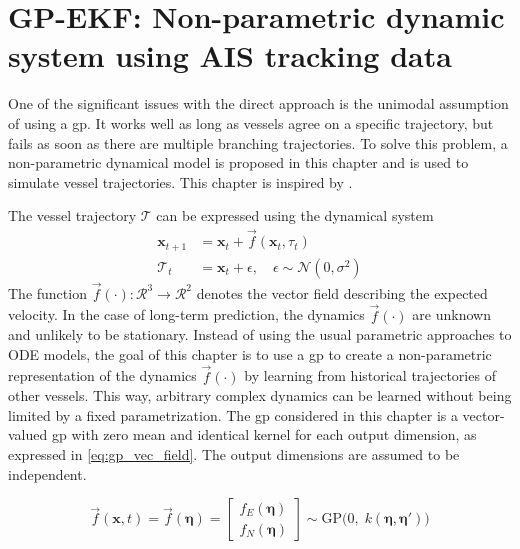 \chapter{GP-EKF: Non-parametric dynamic system using AIS tracking data}\label{chap:gp_ekf}
One of the significant issues with the direct approach is the unimodal assumption of using a \acrshort{gp}. It works well as long as vessels agree on a specific trajectory, but fails as soon as there are multiple branching trajectories. To solve this problem, a non-parametric dynamical model is proposed in this chapter and is used to simulate vessel trajectories. This chapter is inspired by \cite{pedestrian,gpekf,vehicle_gp_prediction,multistep_gp}.



The vessel trajectory $\boldsymbol{\mathcal{T}}$ can be expressed using the dynamical system
\begin{subequations}
    \begin{align}
        \boldsymbol{x}_{t+1}       & = \boldsymbol{x}_t + \vec{f}(\boldsymbol{x}_t,\tau_t)                       \\
        \boldsymbol{\mathcal{T}}_t & = \boldsymbol{x}_t + \epsilon, \quad \epsilon \sim \mathcal{N}(0, \sigma^2)
    \end{align}
\end{subequations}
The function $\vec{f}(\cdot): \mathcal{R}^3 \to \mathcal{R}^2$ denotes the vector field describing the expected velocity. In the case of long-term prediction, the dynamics $\vec{f}(\cdot)$ are unknown and unlikely to be stationary. Instead of using the usual parametric approaches to ODE models, the goal of this chapter is to use a \acrshort{gp} to create a non-parametric representation of the dynamics $\vec{f}(\cdot)$ by learning from historical trajectories of other vessels. This way, arbitrary complex dynamics can be learned without being limited by a fixed parametrization. The \acrshort{gp} considered in this chapter is a vector-valued \acrshort{gp} with zero mean and identical kernel for each output dimension, as expressed in \cref{eq:gp_vec_field}. The output dimensions are assumed to be independent.

\begin{equation}\label{eq:gp_vec_field}
    \vec{f}(\boldsymbol{x}, t) = \vec{f}(\boldsymbol{\eta}) = \begin{bmatrix} f_E (\boldsymbol{\eta})\\ f_N (\boldsymbol{\eta})\end{bmatrix} \sim \text{GP} \big(0 , \; k(\boldsymbol{\eta}, \boldsymbol{\eta}')\big)
\end{equation}

